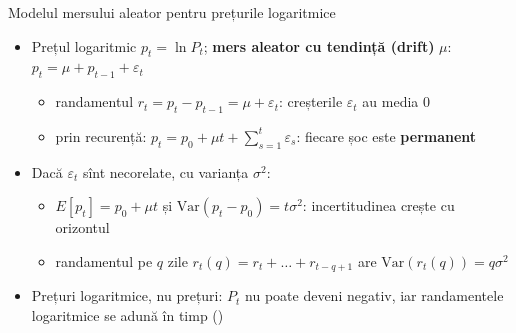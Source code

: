\begin{frame}{Modelul mersului aleator pentru prețurile logaritmice}
\itemsize{\small}
\begin{itemize}
    \item Prețul logaritmic $p_t = \ln P_t$; \textbf{mers aleator cu tendință (drift)} $\mu$: $p_t = \mu + p_{t-1} + \varepsilon_t$
    \begin{itemize}
        \item randamentul $r_t = p_t - p_{t-1} = \mu + \varepsilon_t$: creșterile $\varepsilon_t$ au media 0
        \item prin recurență: $p_t = p_0 + \mu t + \sum_{s=1}^{t} \varepsilon_s$: fiecare șoc este \textbf{permanent}
    \end{itemize}
    \item Dacă $\varepsilon_t$ sînt necorelate, cu varianța $\sigma^2$:
    \begin{itemize}
        \item $E[p_t] = p_0 + \mu t$ și $\mathrm{Var}(p_t - p_0) = t\sigma^2$: incertitudinea crește cu orizontul
        \item randamentul pe $q$ zile $r_t(q) = r_t + \dots + r_{t-q+1}$ are $\mathrm{Var}(r_t(q)) = q\sigma^2$
    \end{itemize}
    \item Prețuri logaritmice, nu prețuri: $P_t$ nu poate deveni negativ, iar randamentele logaritmice se adună în timp ()
\end{itemize}
\end{frame}

